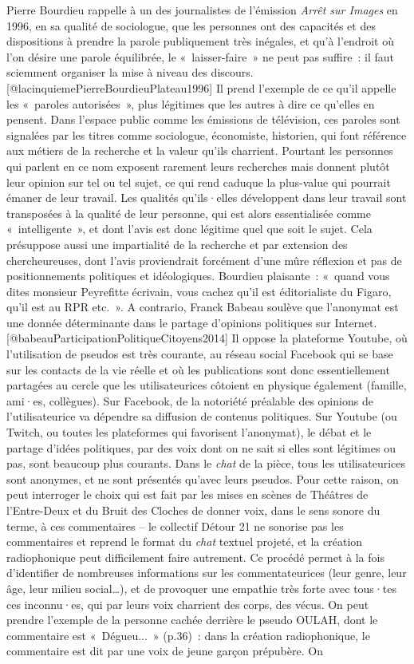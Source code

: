 \documentclass[
]{article}
\begin{document}
Pierre Bourdieu rappelle à un des journalistes de l'émission \emph{Arrêt sur Images} en 1996, en sa qualité de sociologue, que les personnes ont des capacités et des dispositions à prendre la parole publiquement très inégales, et qu'à l'endroit où l'on désire une parole équilibrée, le «~laisser-faire~» ne peut pas suffire~: il faut sciemment organiser la mise à niveau des discours.{[}@lacinquiemePierreBourdieuPlateau1996{]} Il prend l'exemple de ce qu'il appelle les «~paroles autorisées~», plus légitimes que les autres à dire ce qu'elles en pensent. Dans l'espace public comme les émissions de télévision, ces paroles sont signalées par les titres comme sociologue, économiste, historien, qui font référence aux métiers de la recherche et la valeur qu'ils charrient. Pourtant les personnes qui parlent en ce nom exposent rarement leurs recherches mais donnent plutôt leur opinion sur tel ou tel sujet, ce qui rend caduque la plus-value qui pourrait émaner de leur travail. Les qualités qu'ils·elles développent dans leur travail sont transposées à la qualité de leur personne, qui est alors essentialisée comme «~intelligente~», et dont l'avis est donc légitime quel que soit le sujet. Cela présuppose aussi une impartialité de la recherche et par extension des chercheureuses, dont l'avis proviendrait forcément d'une mûre réflexion et pas de positionnements politiques et idéologiques. Bourdieu plaisante~: «~quand vous dites monsieur Peyrefitte écrivain, vous cachez qu'il est éditorialiste du Figaro, qu'il est au RPR etc.~». A contrario, Franck Babeau soulève que l'anonymat est une donnée déterminante dans le partage d'opinions politiques sur Internet.{[}@babeauParticipationPolitiqueCitoyens2014{]} Il oppose la plateforme Youtube, où l'utilisation de pseudos est très courante, au réseau social Facebook qui se base sur les contacts de la vie réelle et où les publications sont donc essentiellement partagées au cercle que les utilisateurices côtoient en physique également (famille, ami·es, collègues). Sur Facebook, de la notoriété préalable des opinions de l'utilisateurice va dépendre sa diffusion de contenus politiques. Sur Youtube (ou Twitch, ou toutes les plateformes qui favorisent l'anonymat), le débat et le partage d'idées politiques, par des voix dont on ne sait si elles sont légitimes ou pas, sont beaucoup plus courants. Dans le \emph{chat} de la pièce, tous les utilisateurices sont anonymes, et ne sont présentés qu'avec leurs pseudos. Pour cette raison, on peut interroger le choix qui est fait par les mises en scènes de Théâtres de l'Entre-Deux et du Bruit des Cloches de donner voix, dans le sens sonore du terme, à ces commentaires -- le collectif Détour 21 ne sonorise pas les commentaires et reprend le format du \emph{chat} textuel projeté, et la création radiophonique peut difficilement faire autrement. Ce procédé permet à la fois d'identifier de nombreuses informations sur les commentateurices (leur genre, leur âge, leur milieu social\ldots), et de provoquer une empathie très forte avec tous·tes ces inconnu·es, qui par leurs voix charrient des corps, des vécus. On peut prendre l'exemple de la personne cachée derrière le pseudo OULAH, dont le commentaire est «~Dégueu...~» (p.36)~: dans la création radiophonique, le commentaire est dit par une voix de jeune garçon prépubère. On 
\end{document}
